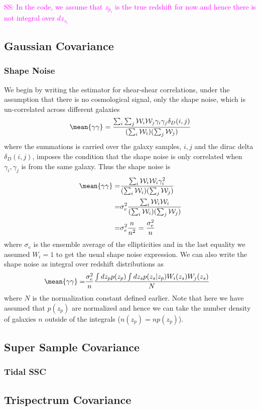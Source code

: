 \documentclass[a4paper,fleqn,usenatbib]{mnras}
\newcommand{\sukhdeep}[1]{{\textcolor{magenta}{SS: #1}}}%
\begin{document}
	\sukhdeep{In the code, we assume that $z_{p_i}$ is the true redshift for now and hence there is not integral over $dz_{s_i}$}

	\subsection{Gaussian Covariance}
		\subsubsection{Shape Noise}
			We begin by writing the estimator for shear-shear correlations, under the assumption that there is no cosmological signal, only 
			the shape noise, which is un-correlated across different galaxies
			\begin{align}
				\mean{\gamma\gamma}=\frac{\sum_i\sum_j \mathcal W_i \mathcal W_j \gamma_i\gamma_j \delta_D(i,j)}{(\sum_i\mathcal W_i)(\sum_j\mathcal W_j)}
			\end{align}
			where the summations is carried over the galaxy samples, $i,j$ and the dirac delta $\delta_D(i,j)$, imposes the condition that the
			shape noise is only correlated when $\gamma_i,\gamma_j$ is from the same galaxy. Thus the shape noise is
			\begin{align}
				\mean{\gamma\gamma}=&\frac{\sum_i \mathcal W_i \mathcal W_i \gamma_i^2}{(\sum_i\mathcal W_i)(\sum_j\mathcal W_j)}\\
									=&\sigma_e^2 \frac{\sum_i \mathcal W_i \mathcal W_i}{(\sum_i\mathcal W_i)(\sum_j\mathcal W_j)}\\
									=&\sigma_e^2 \frac{n}{n^2}= \frac{\sigma_e^2}{n}
			\end{align}
			where $\sigma_e$ is the ensemble average of the ellipticities and in the last equality we assumed $W_i=1$ to get the usual shape noise 
			expression. We can also write the shape noise as integral over redshift distributions as 
			\begin{align}
				\mean{\gamma\gamma}=&\frac{\sigma_e^2}{n}\frac{\int dz_p p(z_p)\int dz_s p(z_s|z_p)W_i(z_s)W_j(z_s)}{N}
			\end{align}
			where $N$ is the normalization constant defined earlier. Note that here we have assumed that $p(z_p)$ are normalized and hence we can take 
			the number density of galaxies $n$ outside of the integrals ($n(z_p)=np(z_p)$).
	\subsection{Super Sample Covariance}
		\subsubsection{Tidal SSC}
	
	\subsection{Trispectrum Covariance}
\end{document}
